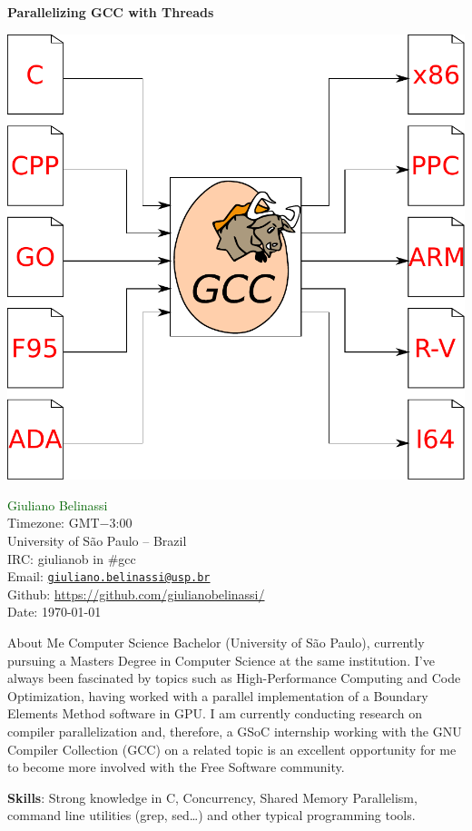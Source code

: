 \documentclass[12pt]{article}
\begin{document}
\newtheorem{theorem}{Teorema}%
\newtheorem{corollary}{Corolário}[theorem]
\newtheorem{lemma}[theorem]{Lema}

\begin{center}
\Huge \bf
Parallelizing GCC with Threads
\vspace{0.5cm}
\end{center}
\vspace*{\fill}
{
     \centering
     \includegraphics[scale=0.7]{logo.pdf}
    \par
}
\vspace*{\fill}
\normalsize{
\noindent\textcolor{darkgreen}{Giuliano Belinassi} \\
Timezone: GMT$-$3:00 \\
University of São Paulo -- Brazil \\
IRC: giulianob in \#gcc \\
Email: \href{mailto:giuliano.belinassi@usp.br}{\texttt{giuliano.belinassi@usp.br}} \\
Github: \url{https://github.com/giulianobelinassi/} \\
Date: \today
}
\newpage

\begin{section}{About Me}
    Computer Science Bachelor (University of São Paulo), 
    currently pursuing a Masters Degree in Computer Science at the same
    institution. I've always been fascinated by topics such as
    High-Performance Computing and Code Optimization, having worked with
    a parallel implementation of a Boundary Elements Method software in GPU.
    I am currently conducting research on compiler parallelization and,
    therefore, a GSoC internship working with the GNU
    Compiler Collection (GCC) on a related topic is an excellent opportunity
    for me to become more involved with the Free Software community.

    \textbf{Skills}: Strong knowledge in C, Concurrency, Shared Memory Parallelism, command line utilities (grep, sed\dots) and other typical programming tools.
\end{section}
\end{document}
